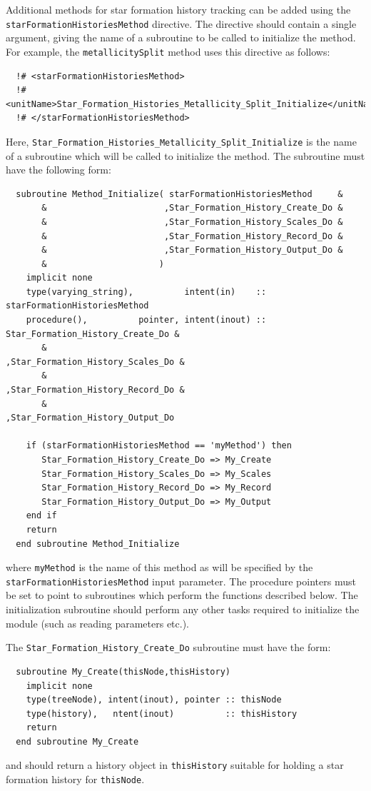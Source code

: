 Additional methods for star formation history tracking  can be added using the {\tt starFormationHistoriesMethod} directive. The directive should contain a single argument, giving the name of a subroutine to be called to initialize the method. For example, the {\tt metallicitySplit} method uses this directive as follows:
\begin{verbatim}
  !# <starFormationHistoriesMethod>
  !#  <unitName>Star_Formation_Histories_Metallicity_Split_Initialize</unitName>
  !# </starFormationHistoriesMethod>
\end{verbatim}
Here, {\tt Star\_Formation\_Histories\_Metallicity\_Split\_Initialize} is the name of a subroutine which will be called to initialize the method. The subroutine must have the following form:
\begin{verbatim}
  subroutine Method_Initialize( starFormationHistoriesMethod     &
       &                       ,Star_Formation_History_Create_Do &
       &                       ,Star_Formation_History_Scales_Do &
       &                       ,Star_Formation_History_Record_Do &
       &                       ,Star_Formation_History_Output_Do &
       &                      )
    implicit none
    type(varying_string),          intent(in)    ::  starFormationHistoriesMethod
    procedure(),          pointer, intent(inout) ::  Star_Formation_History_Create_Do &
       &                                            ,Star_Formation_History_Scales_Do &
       &                                            ,Star_Formation_History_Record_Do &
       &                                            ,Star_Formation_History_Output_Do
    
    if (starFormationHistoriesMethod == 'myMethod') then
       Star_Formation_History_Create_Do => My_Create
       Star_Formation_History_Scales_Do => My_Scales
       Star_Formation_History_Record_Do => My_Record
       Star_Formation_History_Output_Do => My_Output
    end if
    return
  end subroutine Method_Initialize
\end{verbatim}
where {\tt myMethod} is the name of this method as will be specified by the {\tt starFormationHistoriesMethod} input parameter. The procedure pointers must be set to point to subroutines which perform the functions described below. The initialization subroutine should perform any other tasks required to initialize the module (such as reading parameters etc.).

The {\tt Star\_Formation\_History\_Create\_Do} subroutine must have the form:
\begin{verbatim}
  subroutine My_Create(thisNode,thisHistory)
    implicit none
    type(treeNode), intent(inout), pointer :: thisNode
    type(history),   ntent(inout)          :: thisHistory
    return
  end subroutine My_Create
\end{verbatim}
and should return a history object in {\tt thisHistory} suitable for holding a star formation history for {\tt thisNode}.

